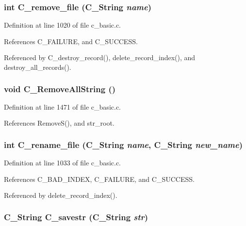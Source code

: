 \subsubsection{\setlength{\rightskip}{0pt plus 5cm}int C\_\-remove\_\-file (\bf{C\_\-String} {\em name})}\label{c__basic_8c_e0b7cbaae88d990dfe025889b802b53f}




Definition at line 1020 of file c\_\-basic.c.

References C\_\-FAILURE, and C\_\-SUCCESS.

Referenced by C\_\-destroy\_\-record(), delete\_\-record\_\-index(), and destroy\_\-all\_\-records().
\subsubsection{\setlength{\rightskip}{0pt plus 5cm}void C\_\-Remove\-All\-String ()}\label{c__basic_8c_e7b53fe3522ac7645bca8c64d3f5b6b0}




Definition at line 1471 of file c\_\-basic.c.

References Remove\-S(), and str\_\-root.
\subsubsection{\setlength{\rightskip}{0pt plus 5cm}int C\_\-rename\_\-file (\bf{C\_\-String} {\em name}, \bf{C\_\-String} {\em new\_\-name})}\label{c__basic_8c_baf27e269e0c0e41339aa204019da059}




Definition at line 1033 of file c\_\-basic.c.

References C\_\-BAD\_\-INDEX, C\_\-FAILURE, and C\_\-SUCCESS.

Referenced by delete\_\-record\_\-index().
\subsubsection{\setlength{\rightskip}{0pt plus 5cm}\bf{C\_\-String} C\_\-savestr (\bf{C\_\-String} {\em str})}\label{c__basic_8c_afdb1c4e6c3f0f7ba69205d57a1f4e21}




